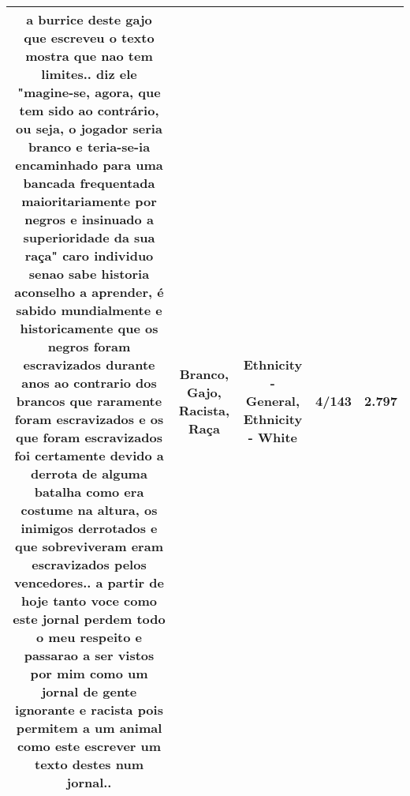 \documentclass[11pt]{article}
\newlength\mylength
\begin{document}
\begin{center}
\begin{longtable}{|C{.65\mylength}|C{.30\mylength}|C{.12\mylength}|C{.12\mylength}|C{.12\mylength}|}
  \small a burrice deste \textbf{gajo} que escreveu o texto mostra que nao tem limites.. diz ele "magine-se, agora, que tem sido ao contrário, ou seja, o jogador seria \textbf{branco} e teria-se-ia encaminhado para uma bancada frequentada maioritariamente por negros e insinuado a superioridade da sua \textbf{raça}" caro individuo senao sabe historia aconselho a aprender, é sabido mundialmente e historicamente que os negros foram escravizados durante anos ao contrario dos brancos que raramente foram escravizados e os que foram escravizados foi certamente devido a derrota de alguma batalha como era costume na altura, os inimigos derrotados e que sobreviveram eram escravizados pelos vencedores.. a partir de hoje tanto voce como este jornal perdem todo o meu respeito e passarao a ser vistos por mim como um jornal de gente ignorante e \textbf{racista} pois permitem a um animal como este escrever um texto destes num jornal..\normalsize   & Branco, Gajo, Racista, Raça & Ethnicity - General, Ethnicity - White & 4/143 & 2.797 \\  \hline

\end{longtable}
\end{center}
\end{document}
